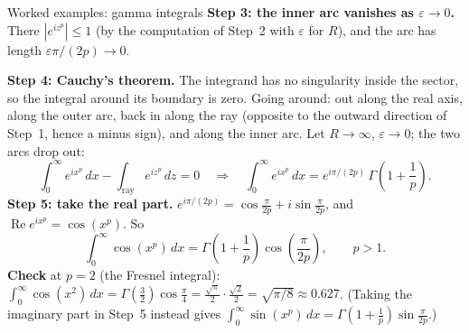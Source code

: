 \documentclass[11pt]{beamer}
\begin{document}
\begin{frame}[allowframebreaks=1.00]{Worked examples: gamma integrals}
\textbf{Step 3: the inner arc vanishes as \(\varepsilon\to0\).} There \(|e^{iz^p}|\le1\) (by the
computation of Step~2 with \(\varepsilon\) for \(R\)), and the arc has length \(\varepsilon\pi/(2p)\to0\).
\par\framebreak\par
\textbf{Step 4: Cauchy's theorem.} The integrand has no singularity inside the sector, so the
integral around its boundary is zero. Going around: out along the real axis, along the outer
arc, back in along the ray (opposite to the outward direction of Step~1, hence a minus sign),
and along the inner arc. Let \(R\to\infty\), \(\varepsilon\to0\); the two arcs drop out:
\[
  \int_0^\infty e^{ix^p}\,dx-\int_{\mathrm{ray}}e^{iz^p}\,dz=0
  \quad\Longrightarrow\quad
  \int_0^\infty e^{ix^p}\,dx
   =e^{i\pi/(2p)}\,\Gamma\left(1+\frac1p\right).
\]
\textbf{Step 5: take the real part.} \(e^{i\pi/(2p)}=\cos\frac{\pi}{2p}+i\sin\frac{\pi}{2p}\), and
\(\operatorname{Re}e^{ix^p}=\cos(x^p)\). So
\begin{equation}
  \int_0^\infty\cos(x^p)\,dx
   =\Gamma\left(1+\frac1p\right)
    \cos\left(\frac{\pi}{2p}\right),
  \qquad p>1.
  \label{eq:cos-xp}
\end{equation}
\textbf{Check} at \(p=2\) (the Fresnel integral):
\(\int_0^\infty\cos(x^2)\,dx=\Gamma(\tfrac32)\cos\tfrac\pi4=\frac{\sqrt\pi}{2}\cdot\frac{\sqrt2}{2}=\sqrt{\pi/8}\approx0.627\).
(Taking the imaginary part in Step~5 instead gives \(\int_0^\infty\sin(x^p)\,dx=\Gamma(1+\frac1p)\sin\frac{\pi}{2p}\).)
\end{frame}
\end{document}

